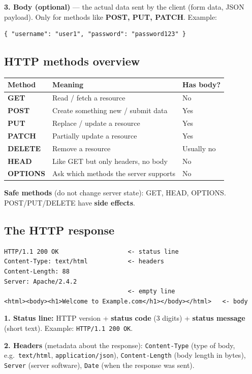 \textbf{3. Body (optional)} --- the actual data sent by the client (form data, JSON payload). Only for methods like \textbf{POST, PUT, PATCH}. Example:
\begin{lstlisting}
{ "username": "user1", "password": "password123" }
\end{lstlisting}

\subsection{HTTP methods overview}
\begin{center}
\begin{tabularx}{\textwidth}{>{\ttfamily\bfseries}l X l}
\toprule
\textrm{Method} & Meaning & Has body? \\
\midrule
GET & Read / fetch a resource & No \\
POST & Create something new / submit data & Yes \\
PUT & Replace / update a resource & Yes \\
PATCH & Partially update a resource & Yes \\
DELETE & Remove a resource & Usually no \\
HEAD & Like GET but only headers, no body & No \\
OPTIONS & Ask which methods the server supports & No \\
\bottomrule
\end{tabularx}
\end{center}
\textbf{Safe methods} (do not change server state): GET, HEAD, OPTIONS. POST/PUT/DELETE have \textbf{side effects}.

\subsection{The HTTP response}
\begin{lstlisting}
HTTP/1.1 200 OK                   <- status line
Content-Type: text/html           <- headers
Content-Length: 88
Server: Apache/2.4.2
                                  <- empty line
<html><body><h1>Welcome to Example.com</h1></body></html>   <- body
\end{lstlisting}

\textbf{1. Status line:} HTTP version + \textbf{status code} (3 digits) + \textbf{status message} (short text). Example: \texttt{HTTP/1.1 200 OK}.

\textbf{2. Headers} (metadata about the response):
\texttt{Content-Type} (type of body, e.g.\ \texttt{text/html}, \texttt{application/json}), \texttt{Content-Length} (body length in bytes), \texttt{Server} (server software), \texttt{Date} (when the response was sent).

